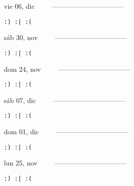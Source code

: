 \documentclass[letterpaper,10pt]{article}
\begin{document}
\begin{multicols}{3}
{vie 06, dic\ \ \ \ \ --------------------------------}
\begin{flushright}\begin{small}\texttt{:) :| :(}\end{small}\end{flushright}
\vfill
{sáb 30, nov\ \ \ \ \ --------------------------------}
\begin{flushright}\begin{small}\texttt{:) :| :(}\end{small}\end{flushright}\par
\vfill
{dom 24, nov\ \ \ \ \ --------------------------------}
\begin{flushright}\begin{small}\texttt{:) :| :(}\end{small}\end{flushright}\par
\vfill
\end{multicols}
\vspace{1.05cm}

\begin{multicols}{3}
{sáb 07, dic\ \ \ \ \ --------------------------------}
\begin{flushright}\begin{small}\texttt{:) :| :(}\end{small}\end{flushright}
\vfill
{dom 01, dic\ \ \ \ \ --------------------------------}
\begin{flushright}\begin{small}\texttt{:) :| :(}\end{small}\end{flushright}\par
\vfill
{lun 25, nov\ \ \ \ \ --------------------------------}
\begin{flushright}\begin{small}\texttt{:) :| :(}\end{small}\end{flushright}\par
\vfill
\end{multicols}
\vspace{1.05cm}
\end{document}
